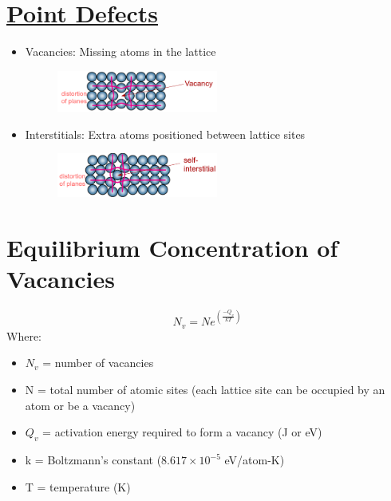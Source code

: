 \documentclass[12pt]{article}
\begin{document}
\section*{\LARGE\underline{Point Defects}}
\begin{itemize}
    \item Vacancies: Missing atoms in the lattice
    \begin{figure}[H]
        \centering
        \includegraphics[width=0.5\textwidth]{vacancy.png}
    \end{figure}
    \item Interstitials: Extra atoms positioned between lattice sites
    \begin{figure}[H]
        \centering
        \includegraphics[width=0.5\textwidth]{intersitial.png}
    \end{figure}
\end{itemize}
\section*{Equilibrium Concentration of Vacancies}
\[ N_v = Ne^{\left( \frac{-Q_v}{kT} \right)}\]
Where:
\begin{itemize}
    \item $N_v$ = number of vacancies
    \item N = total number of atomic sites (each lattice site can be occupied by an atom or be a vacancy)
    \item $Q_v$ = activation energy required to form a vacancy (J or eV)
    \item k = Boltzmann's constant ($8.617 \times 10^{-5}$ eV/atom-K)
    \item T = temperature (K)
\end{itemize}
\newpage
\end{document}
